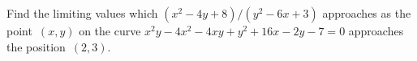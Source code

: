 Find the limiting values which $(x^{2} - 4y + 8)/(y^{2} - 6x + 3)$ approaches
as the point~$(x, y)$ on the curve $x^{2}y - 4x^{2} - 4xy + y^{2} + 16x - 2y - 7 = 0$ approaches
the position~$(2, 3)$. 


